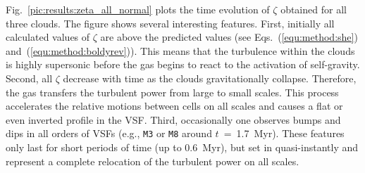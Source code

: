 Fig.~\ref{pic:results:zeta_all_normal} plots the time evolution of $\zeta$ obtained for all three clouds.
The figure shows several interesting features.
First, initially all calculated values of $\zeta$ are above the predicted values (see Eqs.~(\ref{equ:method:she}) and~(\ref{equ:method:boldyrev})).
This means that the turbulence within the clouds is highly supersonic before the gas begins to react to the activation of self-gravity.
Second, all $\zeta$ decrease with time as the clouds gravitationally collapse.
Therefore, the gas transfers the turbulent power from large to small scales.
This process accelerates the relative motions between cells on all scales and causes a flat or even inverted profile in the VSF.
Third, occasionally one observes bumps and dips in all orders of VSFs (e.g., \texttt{M3} or \texttt{M8} around $t$~=~1.7~Myr). 
These features only last for short periods of time (up to 0.6~Myr), but set in quasi-instantly and represent a complete relocation of the turbulent power on all scales. 


